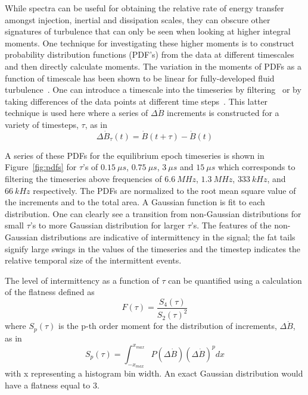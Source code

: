 \documentclass[12pt]{iopart}
\begin{document}
While spectra can be useful for obtaining the relative rate of energy transfer amongst injection, inertial and dissipation scales, they can obscure other signatures of turbulence that can only be seen when looking at higher integral moments. One technique for investigating these higher moments is to construct probability distribution functions (PDF's) from the data at different timescales and then directly calculate moments. The variation in the moments of PDFs as a function of timescale has been shown to be linear for fully-developed fluid turbulence~\cite{frisch95}. One can introduce a timescale into the timeseries by filtering~\cite{frisch95,wan12_apj} or by taking differences of the data points at different time steps~\cite{Greco08,Greco09}. This latter technique is used here where a series of $\Delta \dot{B}$ increments is constructed for a variety of timesteps, $\tau$, as in
\begin{equation}
\Delta \dot{B}_{\tau}(t) = \dot{B}(t+\tau)-\dot{B}(t)
\label{eq:increments}
\end{equation}

A series of these PDFs for the equilibrium epoch timeseries is shown in Figure~\ref{fig:pdfs} for $\tau$'s of $0.15~\mu s$, $0.75~\mu s$, $3~\mu s$ and $15~\mu s$ which corresponds to filtering the timeseries above frequencies of $6.6~MHz$, $1.3~MHz$, $333~kHz$, and $66~kHz$ respectively. The PDFs are normalized to the root mean square value of the increments and to the total area. A Gaussian function is fit to each distribution. One can clearly see a transition from non-Gaussian distributions for small $\tau$'s to more Gaussian distribution for larger $\tau$'s. The features of the non-Gaussian distributions are indicative of intermittency in the signal; the fat tails signify large swings in the values of the timeseries and the timestep indicates the relative temporal size of the intermittent events.

The level of intermittency as a function of $\tau$ can be quantified using a calculation of the flatness defined as~\cite{deWit13}
\begin{equation}
F(\tau) = \frac{S_{4}(\tau)}{S_{2}(\tau)^{2}}
\label{eq:flatness}
\end{equation}
where $S_{p}(\tau)$ is the p-th order moment for the distribution of increments, $\Delta \dot{B}$, as in
\begin{equation}
S_{p}(\tau) = \int_{-x_{max}}^{x_{max}} P(\Delta \dot{B})(\Delta \dot{B})^{p} dx
\label{eq:structurefunc}
\end{equation}
with x representing a histogram bin width. An exact Gaussian distribution would have a flatness equal to 3.
\end{document}
